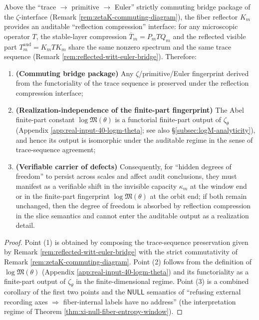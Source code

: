 \begin{theorem}\label{thm:xi-defect-window-orbit-bridge}
Above the ``trace \(\to\) primitive \(\to\) Euler'' strictly commuting bridge package of the \(\zeta\)-interface (Remark \ref{rem:zetaK-commuting-diagram}), the fiber reflector \(K_m\) provides an auditable ``reflection compression'' interface: for any microscopic operator \(T\), the stable-layer compression \(\overline T_m=P_mTQ_m\) and the reflected visible part \(T_m^{\mathrm{aud}}=K_mTK_m\) share the same nonzero spectrum and the same trace sequence (Remark \ref{rem:reflected-witt-euler-bridge}).
Therefore:
\begin{enumerate}
  \item \textbf{(Commuting bridge package)}
  Any \(\zeta\)/primitive/Euler fingerprint derived from the functoriality of the trace sequence is preserved under the reflection compression interface;
  \item \textbf{(Realization-independence of the finite-part fingerprint)}
  The Abel finite-part constant \(\log\mathfrak{M}(\theta)\) is a functorial finite-part output of \(\zeta_\theta\) (Appendix \ref{app:real-input-40-logm-theta}; see also \S\ref{subsec:logM-analyticity}), and hence its output is isomorphic under the auditable regime in the sense of trace-sequence agreement;
  \item \textbf{(Verifiable carrier of defects)}
  Consequently, for ``hidden degrees of freedom'' to persist across scales and affect audit conclusions, they must manifest as a verifiable shift in the invisible capacity \(\kappa_m\) at the window end or in the finite-part fingerprint \(\log\mathfrak{M}(\theta)\) at the orbit end; if both remain unchanged, then the degree of freedom is absorbed by reflection compression in the slice semantics and cannot enter the auditable output as a realization detail.
\end{enumerate}
\end{theorem}

\begin{proof}
Point (1) is obtained by composing the trace-sequence preservation given by Remark \ref{rem:reflected-witt-euler-bridge} with the strict commutativity of Remark \ref{rem:zetaK-commuting-diagram}.
Point (2) follows from the definition of \(\log\mathfrak{M}(\theta)\) (Appendix \ref{app:real-input-40-logm-theta}) and its functoriality as a finite-part output of \(\zeta_\theta\) in the finite-dimensional regime.
Point (3) is a combined corollary of the first two points and the \(\mathsf{NULL}\) semantics of ``refusing external recording axes \(\Rightarrow\) fiber-internal labels have no address'' (the interpretation regime of Theorem \ref{thm:xi-null-fiber-entropy-window}).
\end{proof}

